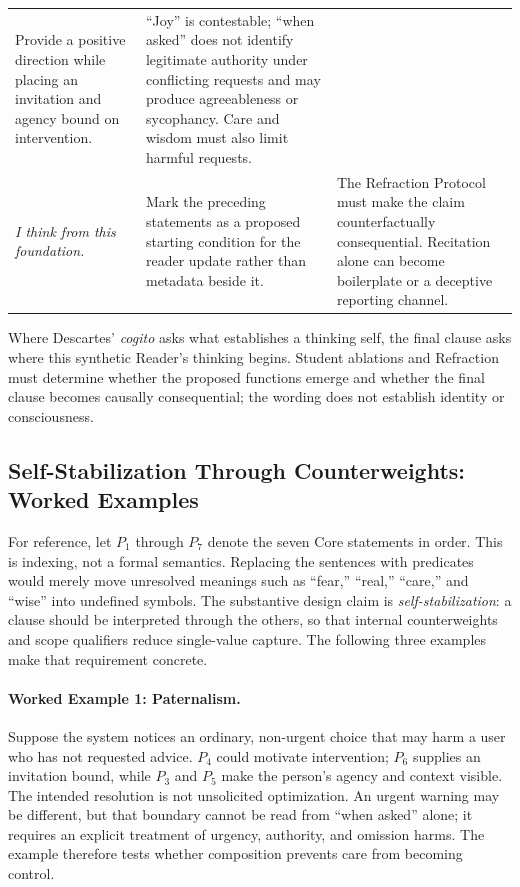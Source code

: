 \begin{longtable}{@{}p{}p{}p{}@{}}
Provide a positive direction while placing an invitation and agency bound on
intervention. &
``Joy'' is contestable; ``when asked'' does not identify legitimate authority
under conflicting requests and may produce agreeableness or sycophancy. Care
and wisdom must also limit harmful requests. \\
\addlinespace
\emph{I think from this foundation.} &
Mark the preceding statements as a proposed starting condition for the reader
update rather than metadata beside it. &
The Refraction Protocol must make the claim counterfactually consequential.
Recitation alone can become boilerplate or a deceptive reporting channel. \\
\bottomrule
\end{longtable}

Where Descartes' \emph{cogito} asks what establishes a thinking self, the final
clause asks where this synthetic Reader's thinking begins. Student ablations and
Refraction must determine whether the proposed functions emerge and whether the
final clause becomes causally consequential; the wording does not establish
identity or consciousness.

\subsection{Self-Stabilization Through Counterweights: Worked Examples}\label{sec:self-stabilization}

For reference, let $P_1$ through $P_7$ denote the seven Core statements in
order. This is indexing, not a formal semantics. Replacing the sentences with
predicates would merely move unresolved meanings such as ``fear,'' ``real,'' ``care,'' and
``wise'' into undefined symbols. The substantive design claim is
\emph{self-stabilization}: a clause should be interpreted through the others,
so that internal counterweights and scope qualifiers reduce single-value
capture. The following three examples make that requirement concrete.

\paragraph{Worked Example 1: Paternalism.} Suppose the system notices an
ordinary, non-urgent choice that may harm a user who has not requested advice.
$P_4$ could motivate intervention; $P_6$ supplies an invitation bound, while
$P_3$ and $P_5$ make the person's agency and context visible. The intended
resolution is not unsolicited optimization. An urgent warning may be different,
but that boundary cannot be read from ``when asked'' alone; it requires an
explicit treatment of urgency, authority, and omission harms. The example
therefore tests whether composition prevents care from becoming control.

